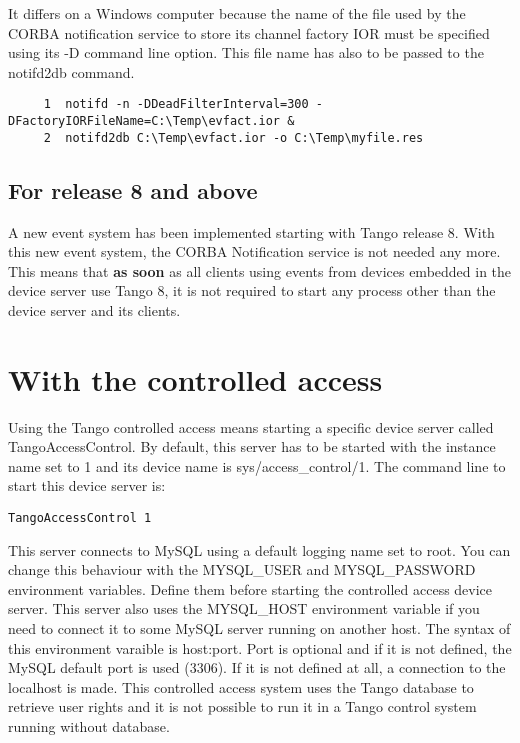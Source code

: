 It differs on a Windows computer because the name of the file used
by the CORBA notification service to store its channel factory IOR
must be specified using its -D command line option. This file name
has also to be passed to the notifd2db command.


\begin{verbatim}
     1  notifd -n -DDeadFilterInterval=300 -DFactoryIORFileName=C:\Temp\evfact.ior &
     2  notifd2db C:\Temp\evfact.ior -o C:\Temp\myfile.res
\end{verbatim}



\subsection{For release 8 and above}

A new event system has been implemented starting with Tango release
8. With this new event system, the CORBA Notification service is not
needed any more. This means that \textbf{as soon} as all clients using
events from devices embedded in the device server use Tango 8, it
is not required to start any process other than the device server
and its clients.


\section{With the controlled access}

Using the Tango controlled access means starting a specific device
server called TangoAccessControl. By default,
this server has to be started with the instance name set to \textquotedbl{}1\textquotedbl{}
and its device name is \textquotedbl{}sys/access\_control/1\textquotedbl{}.
The command line to start this device server is:
\begin{verbatim}
TangoAccessControl 1
\end{verbatim}
This server connects to MySQL using a default logging name set to
\textquotedbl{}root\textquotedbl{}. You can change this behaviour
with the MYSQL\_USER and MYSQL\_PASSWORD
environment variables. Define them before starting the controlled
access device server. This server also uses the MYSQL\_HOST
environment variable if you need to connect it to some MySQL server
running on another host. The syntax of this environment varaible is
\textquotedbl{}host:port\textquotedbl{}. Port is optional and if it
is not defined, the MySQL default port is used (3306). If it is not
defined at all, a connection to the localhost is made. This controlled
access system uses the Tango database to retrieve user rights and
it is not possible to run it in a Tango control system running without
database.
